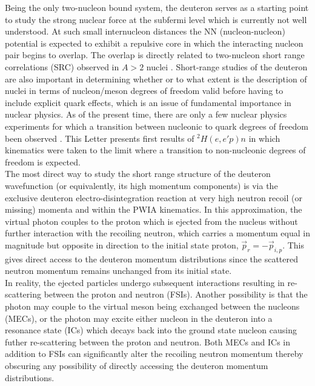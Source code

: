 Being the only two-nucleon bound system, the deuteron serves as a starting point to study the strong nuclear force at the subfermi level which is currently
not well understood. At such small internucleon distances the NN (nucleon-nucleon) potential is expected to exhibit a repulsive core in which the interacting
nucleon pair begins to overlap. The overlap is directly related to two-nucleon short range correlations (SRC) observed in $A>2$ nuclei \cite{PhysRevC.68.014313,PhysRevLett.96.082501,PhysRevLett.99.072501,Fomin_2017}.
Short-range studies of the deuteron are also important in determining whether or to what extent is the description of nuclei in terms of nucleon/meson degrees of freedom valid before
having to include explicit quark effects, which is an issue of fundamental importance in nuclear physics\cite{pr01-020}. As of the present time, there are only a few nuclear physics experiments for
which a transition between nucleonic to quark degrees of freedom been observed \cite{PhysRevLett.81.4576,PhysRevLett.87.102302,PhysRevC.66.042201}.
This Letter presents first results of $^{2}H(e,e'p)n$ in which kinematics were taken to the limit where a transition to non-nucleonic degrees of freedom is expected.\\
\indent The most direct way to study the short range structure of the deuteron wavefunction (or equivalently, its high momentum components) is via the exclusive deuteron
electro-disintegration reaction at very high neutron recoil (or missing) momenta and within the PWIA kinematics. In this approximation, the virtual photon couples to
the proton which is ejected from the nucleus without further interaction with the recoiling neutron, which carries a momentum equal in magnitude but opposite in direction
to the initial state proton, $\vec{p}_{r} = -\vec{p}_{i,p}$. This gives direct access to the deuteron momentum distributions since the scattered neutron momentum remains unchanged from its initial state. \\
\indent In reality, the ejected particles undergo subsequent interactions resulting in re-scattering between the proton and neutron (FSIs). Another possibility is that the
photon may couple to the virtual meson being exchanged between the nucleons (MECs), or the photon may excite either nucleon in the deuteron into a resonance state (ICs) which
decays back into the ground state nucleon causing futher re-scattering between the proton and neutron. Both MECs and ICs in addition to FSIs can significantly alter the recoiling neutron
momentum thereby obscuring any possibility of directly accessing the deuteron momentum distributions. \\

